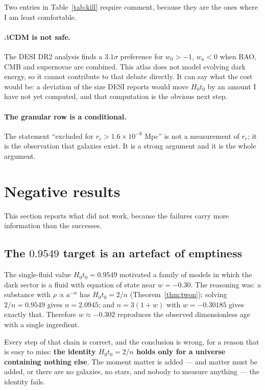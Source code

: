\documentclass[11pt,a4paper]{article}
\theoremstyle{definition}
\newcommand{\Hzt}{H_0 t_0}
\begin{document}
Two entries in Table~\ref{tab:kill} require comment, because they are the
ones where I am least comfortable.

\paragraph{$\Lambda$CDM is not safe.} The DESI DR2 analysis \cite{desi2024}
finds a $3.1\sigma$ preference for $w_0 > -1$, $w_a < 0$ when BAO, CMB and
supernovae are combined. This atlas does not model evolving dark energy, so it
cannot contribute to that debate directly. It can say what the cost would be:
a deviation of the size DESI reports would move $\Hzt$ by an amount I have
not yet computed, and that computation is the obvious next step.

\paragraph{The granular row is a conditional.} The statement ``excluded for
$r_c > 1.6\times10^{-6}$ Mpc'' is not a measurement of $r_c$; it is the
observation that galaxies exist. It is a strong argument and it is the whole
argument.

\section{Negative results}
\label{sec:negative}

This section reports what did not work, because the failures carry more
information than the successes.

\subsection{The $0.9549$ target is an artefact of emptiness}

The single-fluid value $H_0t_0 = 0.9549$ motivated a family of models in which
the dark sector is a fluid with equation of state near $w = -0.30$. The
reasoning was: a substance with $\rho \propto a^{-n}$ has $\Hzt = 2/n$
(Theorem~\ref{thm:twon}); solving $2/n = 0.9549$ gives $n = 2.0945$; and
$n = 3(1+w)$ with $w = -0.30185$ gives exactly that. Therefore $w \approx
-0.302$ reproduces the observed dimensionless age with a single ingredient.

Every step of that chain is correct, and the conclusion is wrong, for a reason
that is easy to miss: \textbf{the identity $\Hzt = 2/n$ holds only for a
universe containing nothing else}. The moment matter is added --- and matter
must be added, or there are no galaxies, no stars, and nobody to measure
anything --- the identity fails.
\end{document}
